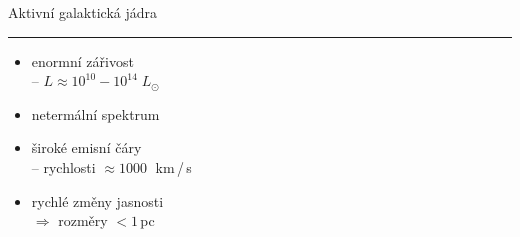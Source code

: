 \documentclass[aspectratio=43]{beamer}
\begin{document}
\begin{frame}{\vspace{-2mm}Aktivní galaktická jádra\phantom{j$^1$}\\\vspace{1.5mm}\hrule}
\vspace{-10.0mm}
\begin{itemize}
    \item<2-> enormní zářivost\\ \vspace{1.5mm} 
        -- $L \approx 10^{10} - 10^{14} \; L_{\odot}$ \\ \vspace{2.1mm}
    \item<2-> netermální spektrum\\ \vspace{2.1mm}
    \item<3-> široké emisní čáry\\ \vspace{1.5mm}
        -- rychlosti $\approx 1000\;$ km\,/\,s\\ \vspace{2.1mm}
    \item<4-> rychlé změny jasnosti\\ \vspace{1.5mm}
        $\Rightarrow$ rozměry $< 1\,$pc\\
\end{itemize}
\begin{tikzpicture}[overlay]


\end{tikzpicture}
\end{frame}
\end{document}
